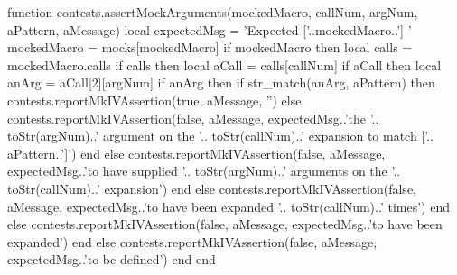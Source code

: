 \stopTestCase

\startConTest
\startMocking
  \startAssertShouldFail{}{}{}
  \stopAssertShouldFail
  \aContextMock
  \startAssertShouldFail{}{}{}
  \stopAssertShouldFail
  \startAssertShouldFail{}{}{}
  \stopAssertShouldFail
\stopMocking
\stopConTest
\stopTestCase
\stopTestSuite

\startTestSuite[assertMockNthArgumentOnMthExpansionMatches]

\startMkIVCode
\def\assertMockNthArgumentOnMthExpansionMatches#1#2#3#4#5{%
  \directlua{%
    thirddata.contests.assertMockArguments(
      '#1', #3, #2, '#4', '#5'
    )
  }
}
\stopMkIVCode

\startLuaCode
function contests.assertMockArguments(mockedMacro,
                                      callNum,
                                      argNum,
                                      aPattern,
                                      aMessage)
  local expectedMsg = 'Expected ['..mockedMacro..'] '
  mockedMacro = mocks[mockedMacro]
  if mockedMacro then
    local calls = mockedMacro.calls
    if calls then
      local aCall = calls[callNum]
      if aCall then
        local anArg = aCall[2][argNum]
        if anArg then
          if str_match(anArg, aPattern) then
            contests.reportMkIVAssertion(true, aMessage, '')
          else
            contests.reportMkIVAssertion(false, aMessage,
              expectedMsg..'the '..
              toStr(argNum)..' argument on the '..
              toStr(callNum)..' expansion to match ['..
              aPattern..']')
          end
        else
          contests.reportMkIVAssertion(false, aMessage,
            expectedMsg..'to have supplied '..
            toStr(argNum)..' arguments on the '..
            toStr(callNum)..' expansion')
        end
      else
        contests.reportMkIVAssertion(false, aMessage,
          expectedMsg..'to have been expanded '..
          toStr(callNum)..' times')
      end
    else
      contests.reportMkIVAssertion(false, aMessage,
        expectedMsg..'to have been expanded')
    end
  else
    contests.reportMkIVAssertion(false, aMessage,
      expectedMsg..'to be defined')
  end
end
\stopLuaCode


